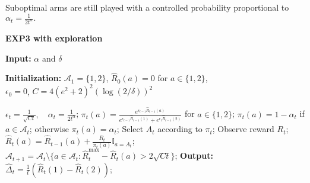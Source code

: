 Suboptimal arms are still played with a controlled probability proportional to \(
\alpha_t = \frac{1}{2t^\alpha}.
\)
\begin{algorithm} [H]
\caption{\textbf{EXP3 with exploration}}
\label{alg:EXP3E}
\textbf{Input:} \( \alpha \) and \( \delta \)

\textbf{Initialization:} \( \mathcal{A}_1 = \{1,2\} \), \( \hat{R}_0(a) = 0 \) for \( a \in \{1,2\} \), \\ 
\hspace{2.5cm} \( \epsilon_0 = 0 \), \( C = 4(e^2 + 2)^2 (\log(2/\delta))^2 \)

\begin{algorithmic}[1]
    \State \( \epsilon_t = \frac{1}{\sqrt{Ct}}, \quad \alpha_t = \frac{1}{2t^\alpha} \);
     
        \State \( \pi_t(a) = \frac{e^{\epsilon_{t-1} \hat{R}_{t-1}(a)}}{e^{\epsilon_{t-1} \hat{R}_{t-1}(1)} + e^{\epsilon_t \hat{R}_{t-1}(2)}} \) for \( a \in \{1,2\} \);
    \Else {}
        \State \( \pi_t(a) = 1 - \alpha_t \) if \( a \in \mathcal{A}_t \); otherwise \( \pi_t(a) = \alpha_t \);
    \EndIf
    \State Select \( A_t \) according to \( \pi_t \);
    \State Observe reward \( R_t \);
        \State \( \hat{R}_t(a) = \hat{R}_{t-1}(a) + \frac{R_t}{\pi_t(a)} \mathbb{I}_{a = A_t} \);
    \EndFor
    \State \( \mathcal{A}_{t+1} = \mathcal{A}_t \setminus \{ a \in \mathcal{A}_t : \hat{R}_t^{\max} - \hat{R}_t(a) > 2\sqrt{Ct} \} \);
    \State \textbf{Output:} \( \hat{\Delta}_t = \frac{1}{t} (\hat{R}_t(1) - \hat{R}_t(2)) \);
\EndFor
\end{algorithmic}
\end{algorithm}


